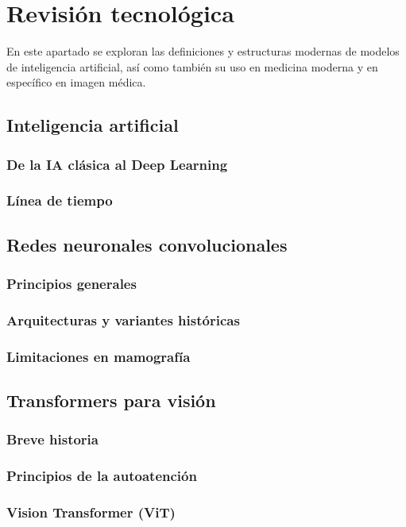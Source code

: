 \documentclass[a4paper,10pt]{book}
\begin{document}
\chapter{Revisión tecnológica}

En este apartado se exploran las definiciones y estructuras modernas de modelos de inteligencia artificial, así como también su uso en medicina moderna y en específico en imagen médica.


\section{Inteligencia artificial}
\subsection{De la IA clásica al Deep Learning}
\subsection{Línea de tiempo}

\section{Redes neuronales convolucionales}
\subsection{Principios generales}
\subsection{Arquitecturas y variantes históricas}
\subsection{Limitaciones en mamografía}


\section{Transformers para visión}
\subsection{Breve historia}
\subsection{Principios de la autoatención}
\subsection{Vision Transformer (ViT)}
\end{document}
